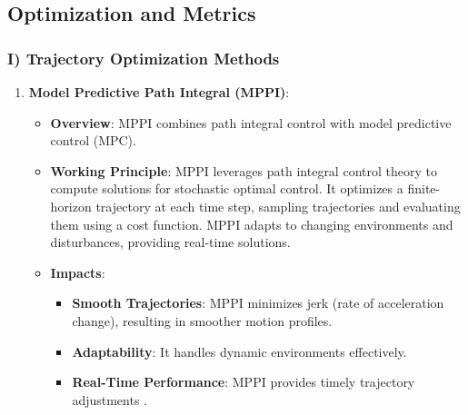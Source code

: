 \documentclass[conference]{IEEEtran}
\begin{document}
\subsection{Optimization and Metrics}
\subsubsection*{I) Trajectory Optimization Methods}
\begin{enumerate}
    \item \textbf{Model Predictive Path Integral (MPPI)}:
          \begin{itemize}
              \item \textbf{Overview}: MPPI combines path integral control with model predictive control (MPC).
              \item \textbf{Working Principle}: MPPI leverages path integral control theory to compute solutions for stochastic optimal control. It optimizes a finite-horizon trajectory at each time step, sampling trajectories and evaluating them using a cost function. MPPI adapts to changing environments and disturbances, providing real-time solutions.
              \item \textbf{Impacts}:
                    \begin{itemize}
                        \item \textbf{Smooth Trajectories}: MPPI minimizes jerk (rate of acceleration change), resulting in smoother motion profiles.
                        \item \textbf{Adaptability}: It handles dynamic environments effectively.
                        \item \textbf{Real-Time Performance}: MPPI provides timely trajectory adjustments \cite{b3}.
                    \end{itemize}
          \end{itemize}


\end{enumerate}
\end{document}
